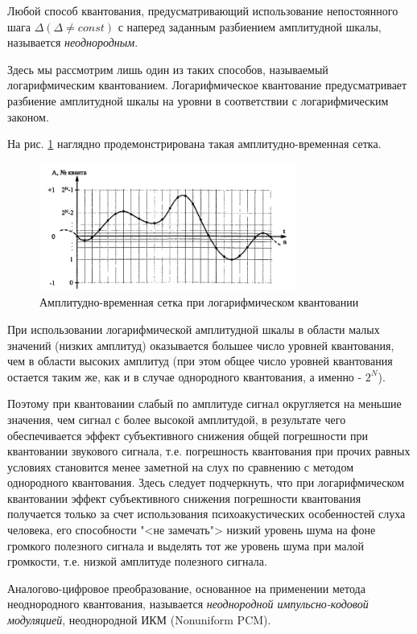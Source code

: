 \documentclass[oneside, final, 14pt]{extreport}
\begin{document}
Любой способ квантования, предусматривающий использование непостоянного шага $\Delta (\Delta\neq const)$ с наперед заданным разбиением амплитудной шкалы, называется \textit{неоднородным}. 

Здесь мы рассмотрим лишь один из таких способов, называемый логарифмическим квантованием. Логарифмическое квантование предусматривает
разбиение амплитудной шкалы на уровни в соответствии с логарифмическим законом. 

На рис. \ref{pic-digital-12} наглядно продемонстрирована такая амплитудно-временная сетка.

\begin{figure}[h]
\centering
\includegraphics[width=0.75\textwidth]{pic-digital-12}
\caption{Амплитудно-временная сетка при логарифмическом квантовании}
\label{pic-digital-12}
\end{figure}

При использовании логарифмической амплитудной шкалы в области малых значений (низких амплитуд) оказывается большее число уровней квантования, чем в области высоких амплитуд (при этом общее число уровней квантования остается таким же, как и в случае однородного квантования, а именно - $2^N$).

Поэтому при квантовании слабый по амплитуде сигнал округляется на меньшие значения, чем сигнал с более высокой амплитудой, в результате чего обеспечивается эффект субъективного снижения общей погрешности при квантовании звукового сигнала, т.е. погрешность квантования при прочих равных условиях становится менее заметной на слух по сравнению с методом однородного квантования. Здесь следует подчеркнуть, что при логарифмическом квантовании эффект субъективного снижения погрешности квантования получается только за счет использования психоакустических особенностей слуха человека, его способности "<не замечать"> низкий уровень шума на фоне громкого полезного сигнала и выделять тот же уровень шума при малой громкости, т.е. низкой амплитуде полезного сигнала.

Аналогово-цифровое преобразование, основанное на применении метода неоднородного квантования, называется \textit{неоднородной импульсно-кодовой модуляцией}, неоднородной ИКМ (Nonuniform PCM).
\end{document}
